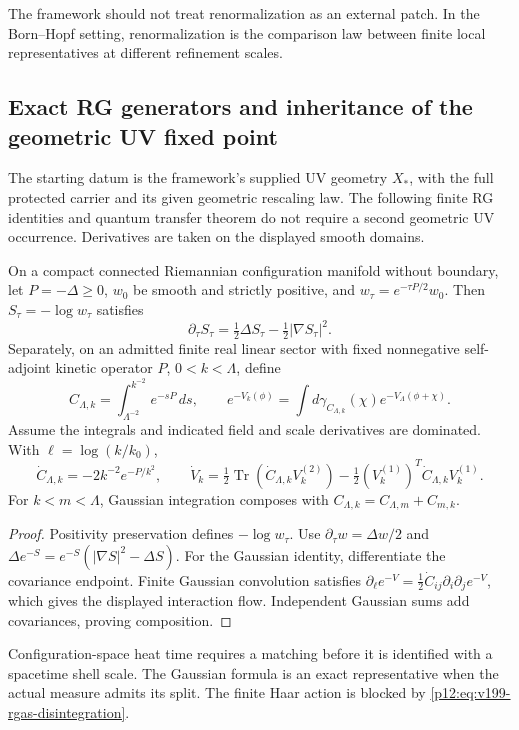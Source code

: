 \documentclass[12pt,a4paper]{article}
\begin{document}
The framework should not treat renormalization as an external patch.  In the Born--Hopf setting, renormalization is the comparison law between finite local representatives at different refinement scales.


\subsection{Exact RG generators and inheritance of the geometric UV fixed point}
\label{p12:sec:v199-rgas}

The starting datum is the framework's supplied UV geometry \(X_*\), with
the full protected carrier and its given geometric rescaling law.
The following finite RG identities and quantum transfer theorem do not
require a second geometric UV occurrence.  Derivatives are taken on the
displayed smooth domains.

\begin{proposition}
\label{p12:prop:v199-rgas-heat-gaussian}
On a compact connected Riemannian configuration manifold without boundary,
let \(P=-\Delta\ge0\), \(w_0\) be smooth and strictly positive, and
\(w_\tau=e^{-\tau P/2}w_0\).  Then \(S_\tau=-\log w_\tau\) satisfies
\begin{equation}
\label{p12:eq:v199-rgas-heat}
 \partial_\tau S_\tau=\tfrac12\Delta S_\tau
                             -\tfrac12|\nabla S_\tau|^2 .
\end{equation}
Separately, on an admitted finite real linear sector with fixed
nonnegative self-adjoint kinetic operator \(P\), \(0<k<\Lambda\), define
\[
 C_{\Lambda,k}=\int_{\Lambda^{-2}}^{k^{-2}}e^{-sP}\,ds,\qquad
 e^{-V_k(\phi)}
  =\int d\gamma_{C_{\Lambda,k}}(\chi)e^{-V_\Lambda(\phi+\chi)} .
\]
Assume the integrals and indicated field and scale derivatives are
dominated.  With \(\ell=\log(k/k_0)\),
\begin{equation}
\label{p12:eq:v199-rgas-gaussian}
 \dot C_{\Lambda,k}=-2k^{-2}e^{-P/k^2},\qquad
 \dot V_k=\tfrac12\operatorname{Tr}(\dot C_{\Lambda,k}V_k^{(2)})
              -\tfrac12(V_k^{(1)})^T\dot C_{\Lambda,k}V_k^{(1)} .
\end{equation}
For \(k<m<\Lambda\), Gaussian integration composes with
\(C_{\Lambda,k}=C_{\Lambda,m}+C_{m,k}\).
\end{proposition}
\begin{proof}
Positivity preservation defines \(-\log w_\tau\).
Use \(\partial_\tau w=\Delta w/2\) and
\(\Delta e^{-S}=e^{-S}(|\nabla S|^2-\Delta S)\).
For the Gaussian identity, differentiate the covariance endpoint.
Finite Gaussian convolution satisfies
\(\partial_\ell e^{-V}=\tfrac12\dot C_{ij}\partial_i\partial_j e^{-V}\),
which gives the displayed interaction flow.
Independent Gaussian sums add covariances, proving composition.
\end{proof}
Configuration-space heat time requires a matching before it is identified
with a spacetime shell scale.  The Gaussian formula is an exact
representative when the actual measure admits its split.  The finite
Haar action is blocked by \eqref{p12:eq:v199-rgas-disintegration}.
\end{document}
